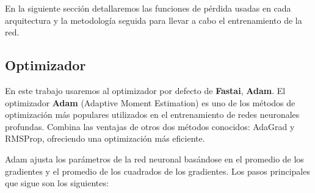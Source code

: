 En la siguiente sección detallaremos las funciones de pérdida usadas en cada arquitectura y la metodología seguida para llevar a cabo el entrenamiento de la red.

\subsection{Optimizador}

En este trabajo usaremos al optimizador por defecto de \textbf{Fastai}, \textbf{Adam}. El optimizador \textbf{Adam} (Adaptive Moment Estimation) \cite{kingma2014adam} es uno de los métodos de optimización más populares utilizados en el entrenamiento de redes neuronales profundas. Combina las ventajas de otros dos métodos conocidos: AdaGrad y RMSProp, ofreciendo una optimización más eficiente.

Adam ajusta los parámetros de la red neuronal basándose en el promedio de los gradientes y el promedio de los cuadrados de los gradientes. Los pasos principales que sigue son los siguientes:

